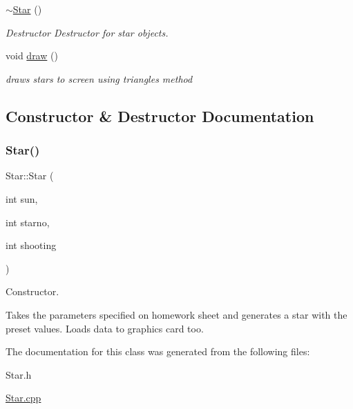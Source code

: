 \begin{DoxyCompactItemize}
\hyperlink{class_star_ac20a90b97d0201576e05aefef2418b94}{$\sim$\+Star} ()
\begin{DoxyCompactList}\small\item\em Destructor Destructor for star objects. \end{DoxyCompactList}\item 
\mbox{\label{class_star_afcc12179f236554d2f01b1923adfd669}} 
void \hyperlink{class_star_afcc12179f236554d2f01b1923adfd669}{draw} ()
\begin{DoxyCompactList}\small\item\em draws stars to screen using triangles method \end{DoxyCompactList}\end{DoxyCompactItemize}


\subsection{Constructor \& Destructor Documentation}
\mbox{\label{class_star_a2bcee00953666bde652d2f83c85da00f}} 
\subsubsection{\texorpdfstring{Star()}{Star()}}
{\footnotesize\ttfamily Star\+::\+Star (\begin{DoxyParamCaption}\item[{int}]{sun,  }\item[{int}]{starno,  }\item[{int}]{shooting }\end{DoxyParamCaption})}



Constructor. 

Takes the parameters specified on homework sheet and generates a star with the preset values. Loads data to graphics card too. 

The documentation for this class was generated from the following files\+:\begin{DoxyCompactItemize}
\item 
Star.\+h\item 
\hyperlink{_star_8cpp}{Star.\+cpp}\end{DoxyCompactItemize}

